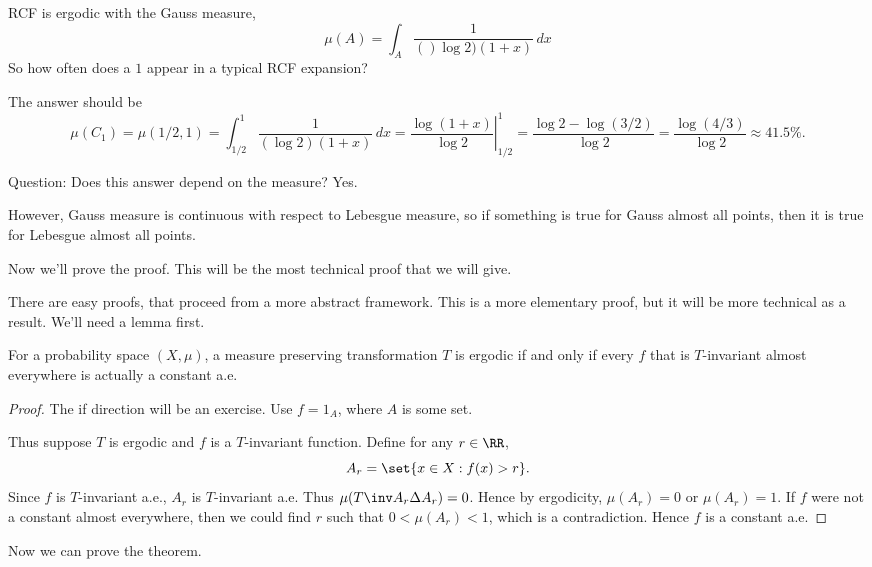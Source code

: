 \documentclass{article}
\theoremstyle{remark}
\begin{document}
\begin{example}
    RCF is ergodic with the Gauss measure,
    \[\mu(A) = \int_A \frac{1}{()\log 2 )(1+x)} \, dx\]
    So how often does a $1$ appear in a typical RCF expansion?

    The answer should be 
    \[ \mu(C_1)=\mu(1/2,1) 
    = \int_{1/2}^1 \frac{1}{(\log 2)(1+x)} \, dx
    = \left.\frac{\log(1+x)}{\log 2} \right|_{1/2}^1 
    = \frac{\log 2  - \log(3/2)}{\log 2}
    = \frac{\log(4/3)}{\log 2}
    \approx 41.5\%.
    \]

    Question: Does this answer depend on the measure? Yes.

    However, Gauss measure is continuous with respect to 
    Lebesgue measure, so if something is true for Gauss 
    almost all points, then it is true for Lebesgue almost all
    points.
\end{example}

Now we'll prove the proof.
This will be the most technical proof that we will give.

There are easy proofs, that proceed from a more abstract framework.
This is a more elementary proof, but it will be more technical as a 
result. We'll need a lemma first.

\begin{lemma}
    For a probability space $(X,\mu)$, a measure preserving
    transformation $T$ is ergodic if and only if every $f$
    that is $T$-invariant almost everywhere is actually a
    constant a.e.
\end{lemma}

\begin{proof}
    The if direction will be an exercise. Use $f=1_A$,
    where $A$ is some set.

    Thus suppose $T$ is ergodic and $f$ is a $T$-invariant
    function. Define for any $r\in\RR$, 
    \[A_r = \set{x\in X : f(x) > r }.\]
    Since $f$ is $T$-invariant a.e., $A_r$ is $T$-invariant a.e.
    Thus $\mu(T\inv A_r \Delta A_r)=0$. Hence by ergodicity,
    $\mu(A_r)=0$ or $\mu(A_r)=1$.
    If $f$ were not a constant almost everywhere, then we could
    find $r$ such that $0<\mu(A_r) < 1$, which is a
    contradiction. Hence $f$ is a constant a.e.
\end{proof}

Now we can prove the theorem.
\end{document}
